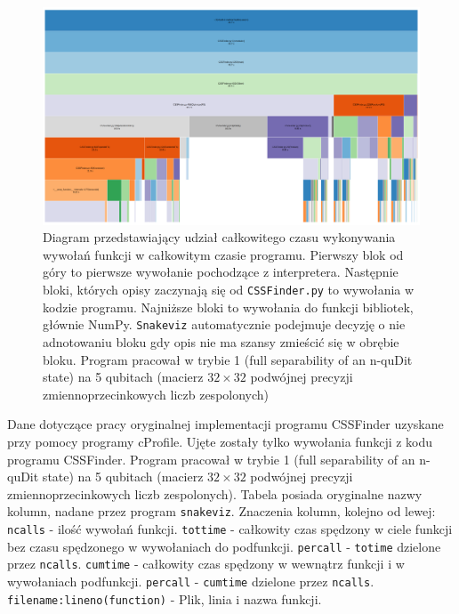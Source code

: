 \documentclass[12pt, a4paper]{article}
\newcommand{\code}[1]{\texttt{#1}}
\begin{document}
\begin{sloppypar}
    \FloatBarrier
    \begin{figure}[h]
      \centering
      \includegraphics[width=1.0\textwidth]{"resources/profiling_1/graph.png"}
      \caption{Diagram przedstawiający udział całkowitego czasu wykonywania wywołań funkcji w całkowitym czasie programu. Pierwszy blok od góry to pierwsze wywołanie pochodzące z interpretera. Następnie bloki, których opisy zaczynają się od \code{CSSFinder.py} to wywołania w kodzie programu. Najniższe bloki to wywołania do funkcji bibliotek, głównie NumPy. \code{Snakeviz} automatycznie podejmuje decyzję o nie adnotowaniu bloku gdy opis nie ma szansy zmieścić się w obrębie bloku. Program pracował w trybie 1 (full separability of an n-quDit state) na 5 qubitach (macierz $3
      2\times32$ podwójnej precyzji zmiennoprzecinkowych liczb zespolonych)}
    \end{figure}
    \FloatBarrier
    \begin{table}[!ht]
      \tiny
      \centering
      
      \caption{{} Dane dotyczące pracy oryginalnej implementacji programu CSSFinder uzyskane przy pomocy programy cProfile. Ujęte zostały tylko wywołania funkcji z kodu programu CSSFinder. Program pracował w trybie 1 (full separability of an n-quDit state) na 5 qubitach (macierz $3
      2\times32$ podwójnej precyzji zmiennoprzecinkowych liczb zespolonych). Tabela posiada oryginalne nazwy kolumn, nadane przez program \code{snakeviz}. Znaczenia kolumn, kolejno od lewej: \code{ncalls} - ilość wywołań funkcji. \code{tottime} - całkowity czas spędzony w ciele funkcji bez czasu spędzonego w wywołaniach do podfunkcji. \code{percall} - \code{totime} dzielone przez \code{ncalls}. \code{cumtime} - całkowity czas spędzony w wewnątrz funkcji i w wywołaniach podfunkcji. \code{percall} - \code{cumtime} dzielone przez \code{ncalls}. \code{filename:lineno(function)} - Plik, linia i nazwa funkcji.}
    \end{table}
    \FloatBarrier


\end{sloppypar}
\end{document}
